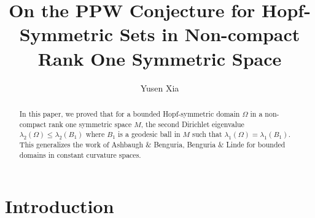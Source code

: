 \documentclass{amsart}
\numberwithin{equation}{section}
\theoremstyle{plain}
\theoremstyle{definition}
\theoremstyle{remark}
\begin{document}
\title{On the PPW Conjecture for Hopf-Symmetric Sets in Non-compact Rank One Symmetric Space}
\author{Yusen Xia}
\address{Department of Mathematics, University of California, Santa Barbara, CA 93106}



\begin{abstract}
    In this paper, we proved that for a bounded Hopf-symmetric domain $\Omega$ in a non-compact rank one symmetric space $M$, the second Dirichlet eigenvalue $\lambda_2(\Omega)\leq \lambda_2(B_1)$ where $B_1$ is a geodesic ball in $M$ such that $\lambda_1(\Omega) = \lambda_1(B_1)$. This generalizes the work of Ashbaugh $\&$ Benguria, Benguria $\&$ Linde for bounded domains in constant curvature spaces. 
\end{abstract}

\maketitle
\tableofcontents


\section{Introduction}
\end{document}
